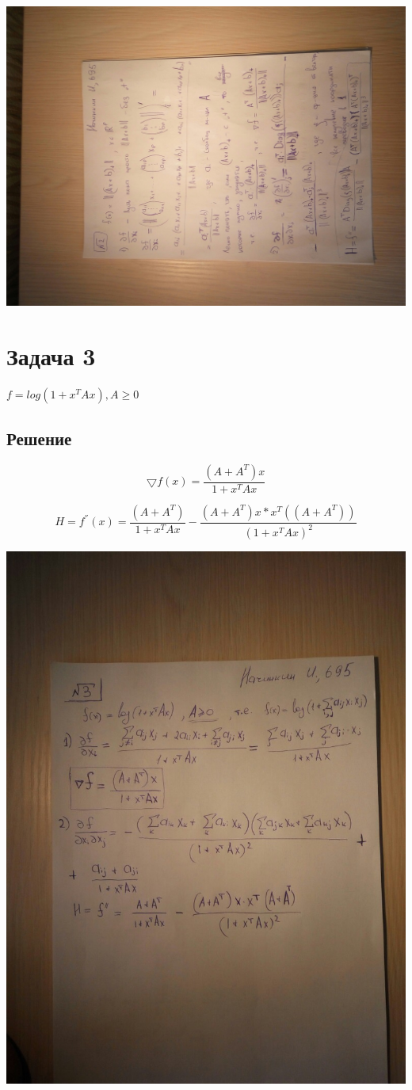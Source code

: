 \documentclass[a4paper]{article}
\begin{document}
\includegraphics[scale=0.3, angle=270]{two}

\section*{Задача 3}
$f = log(1 + x^{T}Ax), A \geq 0$
\subsection*{Решение}
$$\bigtriangledown{f}(x) = \frac{(A + A^{T})x}{1 + x^{T}Ax}$$

$$H = f^{''}(x) = \frac{(A + A^{T})}{1 + x^{T}Ax} - \frac{(A + A^{T})x*x^{T}((A + A^{T}))}{(1 + x^{T}Ax)^{2}}$$

\includegraphics[scale=0.3]{three}
\end{document}
